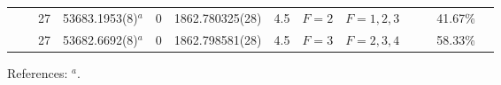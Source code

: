 \begin{table*}
\begin{center}
{\begin{tabular}{:l;l;c;l;c;l;c;l;l;c;c;c;c}
\rowstyle{\itshape}               &        & 27        & 53683.1953(8)$^{a}$              & 0 &   1862.780325(28)  &  4.5 & $F=2                                     $ & $F=1,2,3                                 $ & $      $ &              & 41.67\%   & $          $\\
\rowstyle{\itshape}               &        & 27        & 53682.6692(8)$^{a}$              & 0 &   1862.798581(28)  &  4.5 & $F=3                                     $ & $F=2,3,4                                 $ & $      $ &              & 58.33\%   & $          $\\
\hline
\end{tabular}
}
{\footnotesize References:
$^{a}$\citet{Griesmann:2000:L113}.}
\end{center}
\end{table*}
